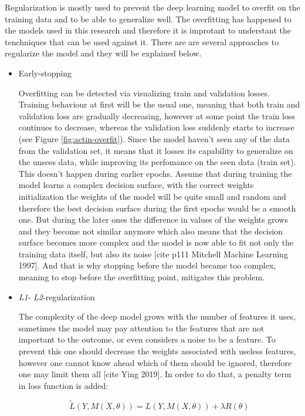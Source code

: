 Regularization is mostly used to prevent the deep learning model to overfit on the training data and to be able to generalize well. The overfitting has happened to the models used in this research and therefore it is improtant to understant the tenchniques that can be used against it. There are are several approaches to regularize the model and they will be explained below.

\begin{itemize}
	\item Early-stopping

	Overfitting can be detected via visualizing train and validation losses. Training behaviour at first will be the usual one, meaning that both train and validation loss are gradually decreasing, however at some point the train loss continues to decrease, whereas the validation loss suddenly starts to increase (see Figure \ref{fig:actin-overfit}). Since the model haven't seen any of the data from the validation set, it means that it losses its capability to generalize on the unsees data, while improving its perfomance on the seen data (train set). This doesn't happen during earlier epochs. Assume that during training the model learns a complex decision surface, with the correct weights initialization the weights of the model will be quite small and random and therefore the best decision surface during the first epochs would be a smooth one. But during the later ones the difference in values of the weights grows and they become not similar anymore which also means that the decision surface becomes more complex and the model is now able to fit not only the training data itself, but also its noise [cite p111 Mitchell Machine Learning 1997]. And that is why stopping before the model became too complex, meaning to stop before the overfitting point, mitigates this problem.

	\item \emph{L1}- \emph{L2}-regularization

	The complexity of the deep model grows with the number of features it uses, sometimes the model may pay attention to the features that are not important to the outcome, or even considers a noise to be a feature. To prevent this one should decrease the weights associated with useless features, however one cannot know ahead which of them should be ignored, therefore one may limit them all [cite Ying 2019]. In order to do that, a penalty term in loss function is added:

	\begin{equation}
	\tilde{L}(Y, M(X, \theta)) = L(Y, M(X, \theta)) + \lambda R(\theta)
	\end{equation}


\end{itemize}
